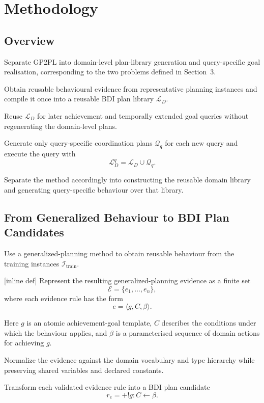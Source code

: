 \section{Methodology}

\subsection{Overview}

Separate GP2PL into domain-level plan-library generation and
query-specific goal realisation, corresponding to the two problems
defined in Section~3.

Obtain reusable behavioural evidence from representative planning
instances and compile it once into a reusable BDI plan library
\(\mathcal{L}_D\).

Reuse \(\mathcal{L}_D\) for later achievement and temporally extended
goal queries without regenerating the domain-level plans.

Generate only query-specific coordination plans \(\mathcal{Q}_q\) for
each new query and execute the query with
\[
\mathcal{L}_D^q
=
\mathcal{L}_D \cup \mathcal{Q}_q.
\]

Separate the method accordingly into constructing the reusable
domain library and generating query-specific behaviour over that
library.


\subsection{From Generalized Behaviour to BDI Plan Candidates}

Use a generalized-planning method to obtain reusable behaviour from
the training instances \(\mathcal{I}_{\mathrm{train}}\).

[inline def] Represent the resulting generalized-planning evidence as
a finite set
\[
\mathcal{E}
=
\{e_1,\ldots,e_n\},
\]
where each evidence rule has the form
\[
e
=
\langle g,C,\beta\rangle.
\]

Here \(g\) is an atomic achievement-goal template, \(C\) describes the
conditions under which the behaviour applies, and \(\beta\) is a
parameterised sequence of domain actions for achieving \(g\).

Normalize the evidence against the domain vocabulary and type
hierarchy while preserving shared variables and declared constants.

Transform each validated evidence rule into a BDI plan candidate
\[
r_e
=
+!g:C\leftarrow\beta.
\]

